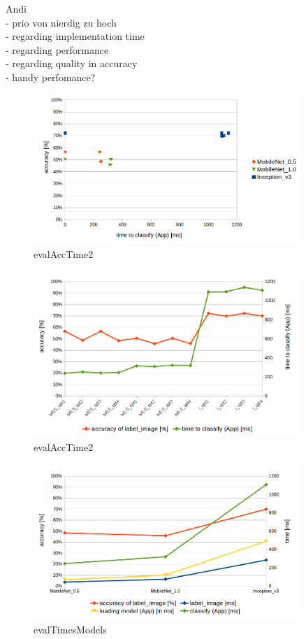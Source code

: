  Andi \\
- prio von nierdig zu hoch \\
- regarding implementation time \\
- regarding performance \\
- regarding quality in accuracy \\
- handy perfomance? \\

\begin{figure}[htbp]
\centering
\includegraphics[width=0.9\textwidth]{includes/evalAccTime}
\caption[evalAccTime2]{evalAccTime2}
\label{fig:bottlenecksCPUUsage}
\end{figure}

\begin{figure}[htbp]
\centering
\includegraphics[width=0.9\textwidth]{includes/evalAccTime2}
\caption[evalAccTime2]{evalAccTime2}
\label{fig:bottlenecksCPUUsage}
\end{figure}

\begin{figure}[htbp]
\centering
\includegraphics[width=0.9\textwidth]{includes/evalTimesModels}
\caption[evalTimesModels]{evalTimesModels}
\label{fig:bottlenecksCPUUsage}
\end{figure}
